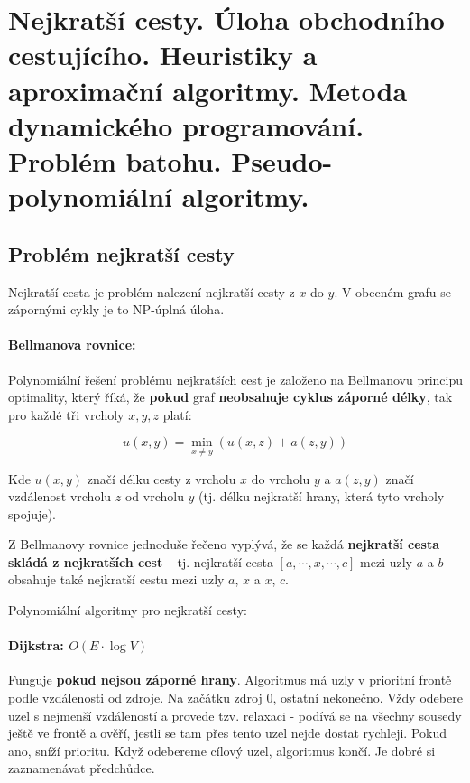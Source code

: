 \section[KO - SPT, TSP, knapsack]{Nejkratší cesty. Úloha obchodního cestujícího. Heuristiky a aproximační algoritmy. Metoda dynamického programování. Problém batohu. Pseudo-polynomiální algoritmy.}

\subsection{Problém nejkratší cesty}

Nejkratší cesta je problém nalezení nejkratší cesty z $x$ do $y$. V obecném grafu se zápornými cykly je to NP-úplná úloha.

\paragraph{Bellmanova rovnice:} Polynomiální řešení problému nejkratších cest je založeno na Bellmanovu principu optimality, který říká, že \textbf{pokud} graf \textbf{neobsahuje cyklus záporné délky}, tak pro každé tři vrcholy $x, y, z$ platí:

$$u(x, y) = \min_{x \neq y} (u(x, z) + a(z, y))$$

Kde $u(x, y)$ značí délku cesty z vrcholu $x$ do vrcholu $y$ a $a(z, y)$ značí vzdálenost vrcholu $z$ od vrcholu $y$ (tj. délku nejkratší hrany, která tyto vrcholy spojuje).

Z Bellmanovy rovnice jednoduše řečeno vyplývá, že se každá \textbf{nejkratší cesta skládá z nejkratších cest} – tj. nejkratší cesta $[a, \cdots , x, \cdots , c]$ mezi uzly $a$ a $b$ obsahuje také nejkratší cestu mezi uzly $a$, $x$ a $x$, $c$.

Polynomiální algoritmy pro nejkratší cesty:

\paragraph{Dijkstra: $O(E\cdot \log V)$} Funguje \textbf{pokud nejsou záporné hrany}. Algoritmus má uzly v prioritní frontě podle vzdálenosti od zdroje. Na začátku zdroj 0, ostatní nekonečno. Vždy odebere uzel s nejmenší vzdáleností a provede tzv. relaxaci - podívá se na všechny sousedy ještě ve frontě a ověří, jestli se tam přes tento uzel nejde dostat rychleji. Pokud ano, sníží prioritu. Když odebereme cílový uzel, algoritmus končí. Je dobré si zaznamenávat předchůdce.

